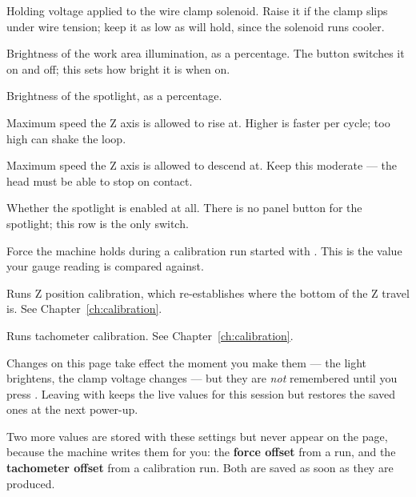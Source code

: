 \begin{description}[leftmargin=!,labelwidth=30mm,style=nextline,font=\normalfont\ttfamily]
\item[Clamp Volt] Holding voltage applied to the wire clamp solenoid. Raise it
  if the clamp slips under wire tension; keep it as low as will hold, since the
  solenoid runs cooler.
\item[Area Light] Brightness of the work area illumination, as a percentage.
  The  button switches it on and off; this sets how bright it is
  when on.
\item[Spotlight] Brightness of the spotlight, as a percentage.
\item[Up Speed] Maximum speed the Z axis is allowed to rise at. Higher is
  faster per cycle; too high can shake the loop.
\item[Down Speed] Maximum speed the Z axis is allowed to descend at. Keep this
  moderate --- the head must be able to stop on contact.
\item[Spot On] Whether the spotlight is enabled at all. There is no panel
  button for the spotlight; this row is the only switch.
\item[Setup Force] Force the machine holds during a calibration run started
  with . This is the value your gauge reading is compared
  against.
\item[Start Z Pos. Cal.] Runs Z position calibration, which re-establishes
  where the bottom of the Z travel is. See Chapter~\ref{ch:calibration}.
\item[Start Tach. Cal.] Runs tachometer calibration. See
  Chapter~\ref{ch:calibration}.
\end{description}

\begin{wbnote}
Changes on this page take effect the moment you make them --- the light
brightens, the clamp voltage changes --- but they are \emph{not} remembered
until you press . Leaving with  keeps the live
values for this session but restores the saved ones at the next power-up.
\end{wbnote}

\begin{wbnote}
Two more values are stored with these settings but never appear on the page,
because the machine writes them for you: the \textbf{force offset} from a
 run, and the \textbf{tachometer offset} from a calibration run.
Both are saved as soon as they are produced.
\end{wbnote}

